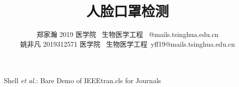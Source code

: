 \documentclass[journal,transmag]{IEEEtran}
\begin{document}
%
\title{人脸口罩检测}




\author{郑家瀚 2019 医学院 \ 生物医学工程 \ @mails.tsinghua.edu.cn\\
姚非凡 2019312571 医学院 \ 生物医学工程\ yff19@mails.tsinghua.edu.cn}%



%
{Shell \MakeLowercase{\textit{et al.}}: Bare Demo of IEEEtran.cls for Journals}
% 









\end{document}
